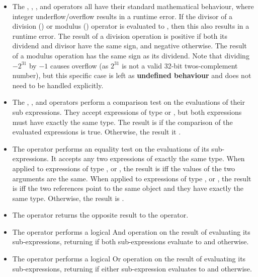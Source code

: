 \documentclass[a4paper]{article}
\theoremstyle{definition}
\begin{document}
\begin{itemize}
\item The \lit{*}, \lit{/}, \lit{\%}, \lit{+} and \lit{-} operators
all have their standard mathematical behaviour, where integer underflow/overflow results in a runtime error.
If the divisor of a division (\lit{/}) or modulus (\lit{\%}) operator is evaluated to , then this also results in a runtime error.
The result of a division operation is positive if both its dividend and divisor have the same sign, and negative otherwise.
The result of a modulus operation has the same sign as its dividend. Note that dividing $-2^{31}$ by $-1$ causes overflow (as
$2^{31}$ is not a valid 32-bit twos-complement number), but this specific case is left as \textbf{undefined behaviour} and does not
need to be handled explicitly.

\item The \lit{>}, \lit{>=}, \lit{<} and \lit{<=} operators perform a comparison test on the evaluations of their sub expressions.
They accept expressions of type  or , but both expressions must have exactly the same type.
The result is  if the comparison of the evaluated expressions is true.
Otherwise, the result it .

\item The \lit{==} operator performs an equality test on the evaluations of its sub-expressions.
It accepts any two expressions of exactly the same type.
When applied to expressions of type ,  or , the result is  iff the values of the two arguments are the same.
When applied to expressions of type ,  or , the result is  iff the two references point to the same object and they have exactly the same type.
Otherwise, the result is .

\item The \lit{!=} operator returns the opposite result to the \lit{==} operator.

\item The \lit{\&\&} operator performs a logical And operation on the result of evaluating its sub-expressions,
returning  if both sub-expressions evaluate to  and  otherwise.

\item The \lit{||} operator performs a logical Or operation on the result of evaluating its sub-expressions,
returning  if either sub-expression evaluates to  and  otherwise.
\end{itemize}
\end{document}
